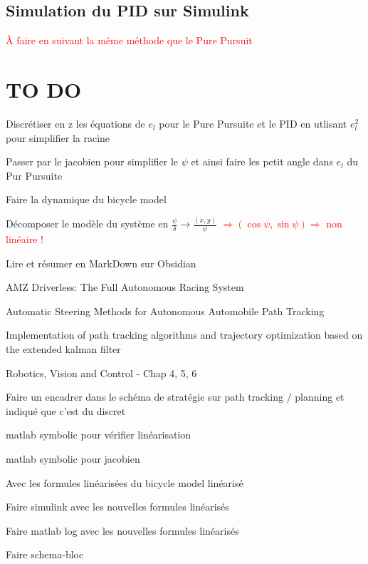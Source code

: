 \documentclass[a4paper,12pt]{extarticle}
\newcommand{\cmark}{\ding{51}}%
\newcommand{\xmark}{\ding{55}}%
\newcommand{\done}{\rlap{$\square$}{\raisebox{2pt}{\large\hspace{1pt}\cmark}}}
\newcommand{\fail}{\rlap{$\square$}{\large\hspace{1pt}\xmark}}
\begin{document}
\subsection{Simulation du PID sur Simulink}
\textcolor{red}{À faire en suivant la même méthode que le Pure Pursuit}

\pagebreak
\section{TO DO}
\begin{todolist}
    \item[\done] Discrétiser en z les équations de $e_l$ pour le Pure Pursuite et le PID en utlisant $e_l^2$ pour simplifier la racine
    \item[\done] Passer par le jacobien pour simplifier le $\psi$ et ainsi faire les petit angle dans $e_l$ du Pur Pursuite
    \item Faire la dynamique du bicycle model
    \item[\fail] Décomposer le modèle du système en $\frac{\psi}{\delta} \rightarrow \frac{(\dot{x},\dot{y})}{\psi}$ \textcolor{red}{$\Rightarrow (\cos\psi,\sin\psi) \Rightarrow$ non linéaire !}
    \item Lire et résumer en MarkDown sur Obsidian 
    \begin{todolist}
      \item[\done] AMZ Driverless: The Full Autonomous Racing System
      \item[\done] Automatic Steering Methods for Autonomous Automobile Path Tracking
      \item Implementation of path tracking algorithms and trajectory optimization based on the extended kalman filter
      \item Robotics, Vision and Control - Chap 4, 5, 6
    \end{todolist}
    \item[\done] Faire un encadrer dans le schéma de stratégie sur path tracking / planning et indiqué que c'est du discret 
    \item[\done] matlab symbolic pour vérifier linéarisation
    \item[\done] matlab symbolic pour jacobien
    \item Avec les formules linéarisées du bicycle model linéarisé
    \begin{todolist}
        \item Faire simulink avec les nouvelles formules linéarisés
        \item Faire matlab log avec les nouvelles formules linéarisés
        \item Faire schema-bloc
     \end{todolist}
    
\end{todolist}

\pagebreak
\end{document}
